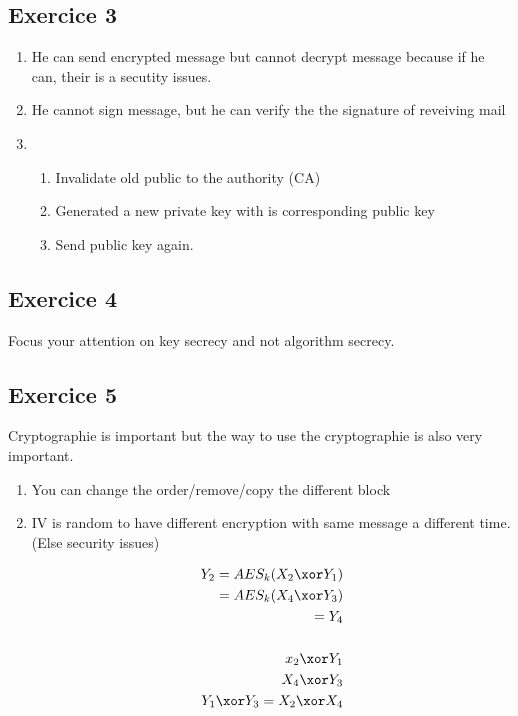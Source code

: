 \subsection{Exercice 3}
\begin{enumerate}
    \item He can send encrypted message but cannot decrypt message
        because if he can, their is a secutity issues.

    \item He cannot sign message, but he can verify the the signature of
        reveiving mail

    \item \begin{enumerate}
            \item Invalidate old public to the authority (CA)
            \item Generated a new private key with is corresponding public key
            \item Send public key again.
        \end{enumerate}
\end{enumerate}


\subsection{Exercice 4}
Focus your attention on key secrecy and not algorithm secrecy.

\subsection{Exercice 5}
Cryptographie is important but the way to use the cryptographie is also
very important.

\begin{enumerate}
    \item You can change the order/remove/copy the different block
    \item IV is random to have different encryption with same message a
        different time. (Else security issues)

        \begin{eqnarray*}
            Y_2 = AES_k (X_2 \xor Y_1) \\
            = AES_k (X_4 \xor Y_3) \\
            = Y_4 \\
            \\
            x_2 \xor Y_1 \\
            X_4 \xor Y_3 \\
            Y_1 \xor Y_3 = X_2 \xor X_4 \\

        \end{eqnarray*}
\end{enumerate}



